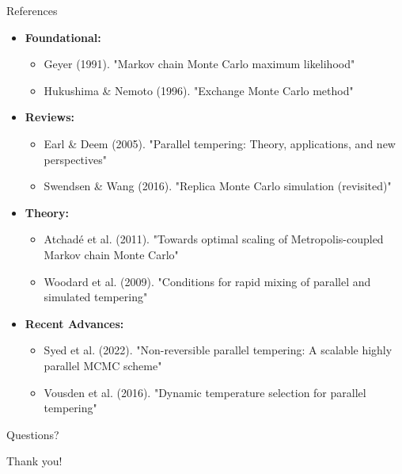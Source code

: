 \documentclass[aspectratio=169]{beamer}
\begin{document}
\begin{frame}{References}
	\begin{itemize}
		\item \textbf{Foundational:}
		      \begin{itemize}
			      \item Geyer (1991). "Markov chain Monte Carlo maximum likelihood"
			      \item Hukushima \& Nemoto (1996). "Exchange Monte Carlo method"
		      \end{itemize}

		\item \textbf{Reviews:}
		      \begin{itemize}
			      \item Earl \& Deem (2005). "Parallel tempering: Theory, applications, and new perspectives"
			      \item Swendsen \& Wang (2016). "Replica Monte Carlo simulation (revisited)"
		      \end{itemize}

		\item \textbf{Theory:}
		      \begin{itemize}
			      \item Atchadé et al. (2011). "Towards optimal scaling of Metropolis-coupled Markov chain Monte Carlo"
			      \item Woodard et al. (2009). "Conditions for rapid mixing of parallel and simulated tempering"
		      \end{itemize}

		\item \textbf{Recent Advances:}
		      \begin{itemize}
			      \item Syed et al. (2022). "Non-reversible parallel tempering: A scalable highly parallel MCMC scheme"
			      \item Vousden et al. (2016). "Dynamic temperature selection for parallel tempering"
		      \end{itemize}
	\end{itemize}
\end{frame}

\begin{frame}
	\begin{center}
		\Huge{\textcolor{copenhagenred}{Questions?}}

		\vspace{1cm}
		\Large{Thank you!}
	\end{center}
\end{frame}
\end{document}
